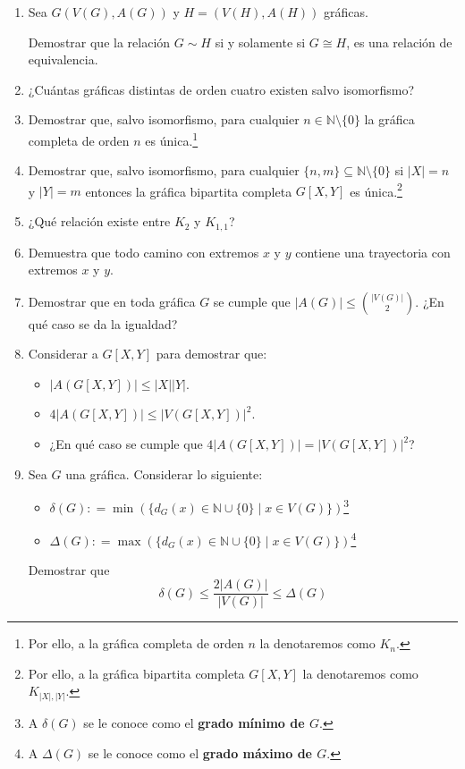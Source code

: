 \documentclass[10pt]{report}
\numberwithin{section}{chapter}
\newcommand{\N}{\mathbb N}
\begin{document}
\begin{enumerate}
\item Sea $G(V(G), A(G))$ y $H=(V(H), A(H))$ gráficas.

Demostrar que la relación $G \sim H$ si y solamente si $G \cong H$, es una relación de equivalencia.

\item ¿Cuántas gráficas distintas de orden cuatro existen salvo isomorfismo?

\item Demostrar que, salvo isomorfismo, para cualquier $n \in \N \setminus\{0\}$ la gráfica completa de orden $n$ es única.\footnote{Por ello, a la gráfica completa de orden $n$ la denotaremos como $K_n$.}

\item Demostrar que, salvo isomorfismo, para cualquier $\{n,m\} \subseteq \N \setminus\{0\}$ si $|X| = n$ y $|Y|=m$ entonces la gráfica bipartita completa $G[X,Y]$ es única.\footnote{Por ello, a la gráfica bipartita completa $G[X,Y]$ la denotaremos como $K_{|X|,|Y|}$.}


\item ¿Qué relación existe entre $K_2$ y $K_{1,1}$?

\item Demuestra que todo camino con extremos $x$ y $y$ contiene una trayectoria con extremos $x$ y $y$.

\item Demostrar que en toda gráfica $G$ se cumple que $|A(G)| \leq {|V(G)|\choose 2}$. ¿En qué caso se da la igualdad?

\item Considerar a $G[X,Y]$ para demostrar que:
\begin{itemize}
\item $|A(G[X,Y])| \leq |X||Y|$.
\item $4 |A(G[X,Y])| \leq |V(G[X,Y])|^2$.
\item ¿En qué caso se cumple que $4 |A(G[X,Y])| = |V(G[X,Y])|^2$?
\end{itemize}

\item Sea $G$ una gráfica. Considerar lo siguiente:
\begin{itemize}
\item $\delta (G) : = \min(\{d_G(x) \in \N \cup \{0\} \; | \; x \in V(G) \})$\footnote{A $\delta(G)$ se le conoce como el \textbf{grado mínimo de $G$}.}
\item $\Delta (G) : = \max(\{d_G(x) \in \N \cup \{0\} \; | \; x \in V(G) \})$\footnote{A $\Delta(G)$ se le conoce como el \textbf{grado máximo de $G$}.}
\end{itemize}
Demostrar que $$ \delta(G) \leq \frac{2 |A(G)|}{|V(G)|} \leq \Delta(G)$$


\end{enumerate}
\end{document}
